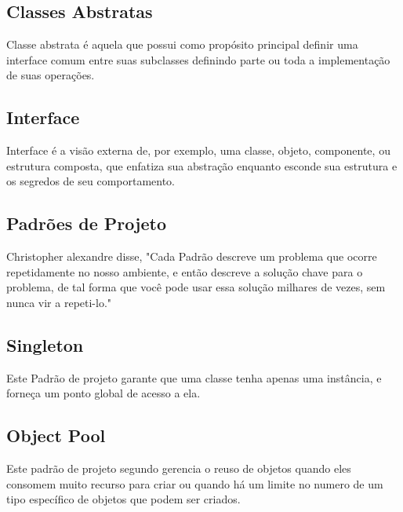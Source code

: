 \subsection{Classes Abstratas}	

Classe abstrata é aquela que possui como propósito principal definir uma interface comum entre suas subclasses definindo parte ou toda a implementação de suas operações. \cite{gram}


\subsection{Interface}	
Interface é a visão externa de, por exemplo, uma classe, objeto, componente, ou estrutura composta, que enfatiza sua abstração enquanto esconde sua estrutura e os segredos de seu comportamento. \cite{gra}

\subsection{Padrões de Projeto}	
Christopher alexandre disse, "Cada Padrão descreve um problema que ocorre repetidamente no nosso ambiente, e então descreve a solução chave para o problema, de tal forma que você pode usar essa solução milhares de vezes, sem nunca vir a repeti-lo." \cite{cris}

\subsection{Singleton}	
Este Padrão de projeto garante que uma classe tenha apenas uma instância, e forneça um ponto global de acesso a ela.  \cite{gra}

\subsection{Object Pool}	
Este padrão de projeto segundo \cite{alan} gerencia o reuso de objetos quando eles consomem muito recurso para criar ou quando há um limite no numero de um tipo específico de objetos que podem ser criados. \cite{alan}